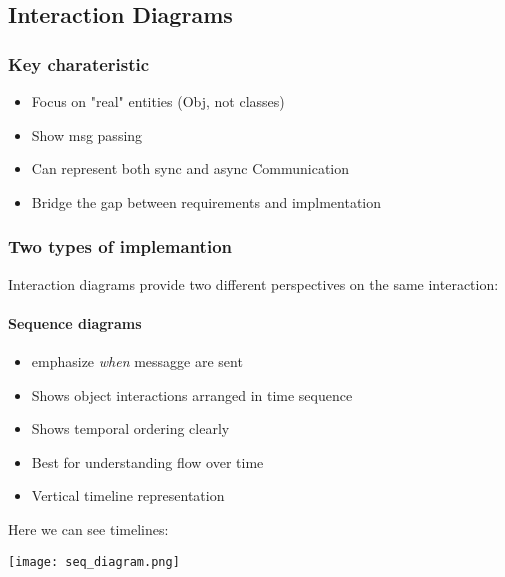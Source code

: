 \subsection{Interaction Diagrams}
\subsubsection{Key charateristic}
\begin{itemize}
    \item Focus on "real" entities (Obj, not classes)
    \item Show msg passing
    \item Can represent both sync and async Communication
    \item Bridge the gap between requirements and implmentation
\end{itemize}

\subsubsection{Two types of implemantion}

Interaction diagrams provide two different perspectives on the same interaction:

\paragraph{Sequence diagrams}
\begin{itemize}
    \item emphasize \textit{when} messagge are sent
    \item Shows object interactions arranged in time sequence
    \item Shows temporal ordering clearly
    \item Best for understanding flow over time
    \item Vertical timeline representation
\end{itemize}

Here we can see timelines:
\begin{center}
    \texttt{[image: seq\_diagram.png]}
\end{center}

